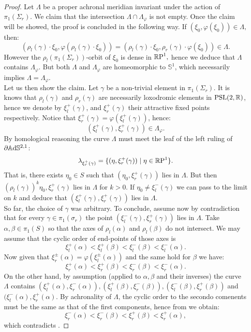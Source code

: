 \begin{proof}
    Let $\Lambda$ be a proper achronal meridian invariant under the action of $\pi_1(\Sigma_r)$. We claim that the intersection $\Lambda\cap \Lambda_\varphi$ is not empty. Once the claim will be showed, the proof is concluded in the following way. If $(\xi_0 , \varphi(\xi_0))\in\Lambda,$ then: 
    \[
        (\rho_l(\gamma)\cdot\xi_0,\varphi(\rho_l(\gamma)\cdot\xi_0))=(\rho_l(\gamma)\cdot\xi_0,\rho_r(\gamma)\cdot\varphi(\xi_0))\in\Lambda.
    \] 
    However the $\rho_l(\pi_1(\Sigma_r))$-orbit of $\xi_0$ is dense in $\S,$ hence we deduce that $\Lambda$ contains $\Lambda_\varphi$. But both $\Lambda$ and $\Lambda_\varphi$ are homeomorphic to $\mathbb{S}^1$, which necessarily implies $\Lambda=\Lambda_\varphi.$\\
    Let us then show the claim. Let $\gamma$ be a non-trivial element in $\pi_1(\Sigma_r)$. It is knows that $\rho_l(\gamma)$ and $\rho_r(\gamma)$ are necessarily loxodromic elements in $\PSL$, hence we denote by $\xi_l^+(\gamma)$, and $\xi_r^+(\gamma)$ their attractive fixed points respectively. Notice that $\xi_r^+(\gamma)=\varphi(\xi_l^+(\gamma))$, hence: 
    \[
        (\xi_l^+(\gamma),\xi_r^+(\gamma))\in \Lambda_\varphi.
    \]
    By homological reasoning the curve $\Lambda$ must meet the leaf of the left ruling of $\partial\A^{2,1}$: 
    \[
        \lambda_{\xi_r^+(\gamma)}=\{(\eta,\xi_r^+(\gamma))\;|\;\eta\in\S\}.
    \]
    That is, there exists $\eta_0\in S$ such that $(\eta_0,\xi_r^+(\gamma))$ lies in $\Lambda$. But then $(\rho_l(\gamma))^k\eta_0,\xi_r^+(\gamma)$ lies in $\Lambda$ for $k>0$. If $\eta_0\neq \xi_l^-(\gamma)$ we can pass to the limit on $k$ and deduce that $(\xi_l^+(\gamma),\xi_r^+(\gamma))$ lies in $\Lambda.$ \\
    So far, the choice of $\gamma$ was arbitrary. To conclude, assume now by contradiction that for every $\gamma\in\pi_1(\sigma_r)$ the point $(\xi_l^-(\gamma),\xi_r^+(\gamma))$ lies in $\Lambda$. Take $\alpha,\beta\in\pi_1(S)$ so that the axes of $\rho_l(\alpha)$ and $\rho_l(\beta)$ do not intersect. We may assume that the cyclic order of end-points of those axes is 
    \begin{equation}\label{57}
        \xi_l^+(\alpha)<\xi_l^+(\beta)<\xi_l^-(\beta)<\xi_l^-(\alpha).
    \end{equation}
    Now given that $\xi_r^\pm(\alpha)=\varphi(\xi_l^\pm(\alpha))$ and the same hold for $\beta$ we have: 
\begin{equation}\label{58}
    \xi_r^+(\alpha)<\xi_r^+(\beta)<\xi_r^-(\beta)<\xi_r^-(\alpha).
\end{equation}
On the other hand, by assumption (applied to $\alpha,\beta$ and their inverses) the curve $\Lambda$ contains $(\xi_l^+(\alpha),\xi_r^-(\alpha)),(\xi_l^+(\beta),\xi _r^-(\beta)), (\xi_l^-(\beta ),\xi_r^+(\beta ))$ and $(\xi_l^-(\alpha),\xi_r^+(\alpha).$ By achronality of $\Lambda$, the cyclic order to the secondo comenents must be the same as that of the first components, hence from  we obtain: 
\[
    \xi_r^-(\alpha)<\xi_r^-(\beta)<\xi_r^+(\beta)<\xi_r^+(\alpha),
\]
which contradicts .
\end{proof}

